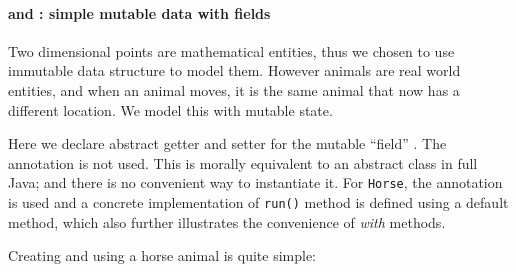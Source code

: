 %
%

\paragraph{\Q@Animal@ and \Q@Horse@: simple mutable data with fields}
Two dimensional points are mathematical entities, thus we chosen to
use immutable data structure to model them. However animals are real
world entities, and when an animal moves, it is the same animal that
now has a different location. We model this with mutable state.


\noindent Here we declare abstract getter and setter for the mutable ``field'' \Q@location@.
The \mixin annotation is not used. This is morally
equivalent to an abstract class in full Java; and there is no
convenient way to instantiate it.
For \texttt{Horse}, the \mixin annotation is used and a concrete implementation of \texttt{run()} method
is defined using a default method, which also further illustrates the convenience of \emph{with} methods.


\noindent Creating and using a horse animal is quite simple:


